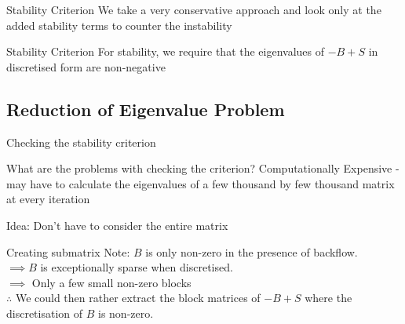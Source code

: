     \begin{frame}{Stability Criterion}
    We take a very conservative approach and look only at the added stability terms to counter the instability
        \begin{block}{Stability Criterion}
            For stability, we require that the eigenvalues of \(-B+S\) in discretised form are non-negative
        \end{block}
    \end{frame}
    \subsection{Reduction of Eigenvalue Problem}
    \begin{frame}{Checking the stability criterion}
    \begin{block}{What are the problems with checking the criterion?}
        Computationally Expensive - may have to calculate the eigenvalues of a few thousand by few thousand matrix at every iteration
    \end{block}
    Idea: Don't have to consider the entire matrix
    \end{frame}
    \begin{frame}{Creating submatrix}
        Note: \(B\) is only non-zero in the presence of backflow.\\
        \(\implies B\) is exceptionally sparse when discretised.\\
        \(\implies\) Only a few small non-zero blocks\\
        \(\therefore\) We could then rather extract the block matrices of \(-B+S\) where the discretisation of \(B\) is non-zero.
    \end{frame}